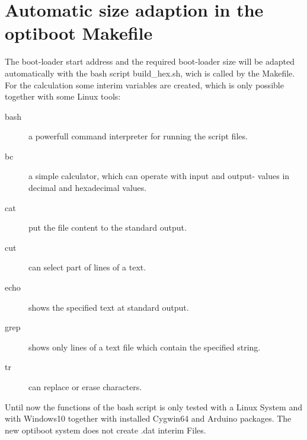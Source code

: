 \section{Automatic size adaption in the optiboot Makefile}

The boot-loader start address and the required boot-loader size will
be adapted automatically with the bash script build\_hex.sh, wich
is called by the Makefile.
For the calculation some interim variables are created,
which is only possible together with some Linux tools:

\begin{description}
\item [bash] a powerfull command interpreter for running the script files.
\item [bc] a simple calculator, which can operate with input and output-
values in decimal and hexadecimal values.
\item [cat] put the file content to the standard output.
\item [cut] can select part of lines of a text.
\item [echo] shows the specified text at standard output.
\item [grep] shows only lines of a text file which contain the specified string.
\item [tr] can replace or erase characters.
\end{description}

Until now the functions of the bash script is only tested with a Linux System and
with Windows10 together with installed Cygwin64 and Arduino packages.
The new optiboot system does not create .dat interim Files.


